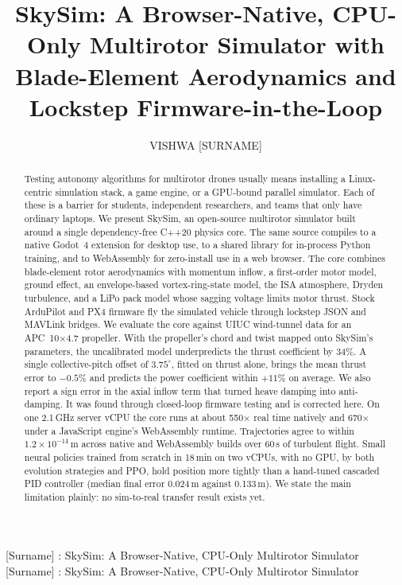 \documentclass{ieeeaccess}
\newcommand{\skysim}{SkySim\xspace}
\begin{document}

\title{SkySim: A Browser-Native, CPU-Only Multirotor Simulator with Blade-Element Aerodynamics and Lockstep Firmware-in-the-Loop}

\author{\uppercase{Vishwa [Surname]}}
\address[1]{Independent Researcher, Negombo, Sri Lanka (e-mail: [email])}

\markboth
{[Surname] \headeretal: SkySim: A Browser-Native, CPU-Only Multirotor Simulator}
{[Surname] \headeretal: SkySim: A Browser-Native, CPU-Only Multirotor Simulator}


\begin{abstract}
Testing autonomy algorithms for multirotor drones usually means installing a
Linux-centric simulation stack, a game engine, or a GPU-bound parallel
simulator. Each of these is a barrier for students, independent researchers,
and teams that only have ordinary laptops. We present \skysim, an open-source
multirotor simulator built around a single dependency-free C++20 physics core.
The same source compiles to a native Godot~4 extension for desktop use, to a
shared library for in-process Python training, and to WebAssembly for
zero-install use in a web browser. The core combines blade-element rotor
aerodynamics with momentum inflow, a first-order motor model, ground effect,
an envelope-based vortex-ring-state model, the ISA atmosphere, Dryden
turbulence, and a LiPo pack model whose sagging voltage limits motor thrust.
Stock ArduPilot and PX4 firmware fly the simulated vehicle through lockstep
JSON and MAVLink bridges. We evaluate the core against UIUC wind-tunnel data for
an APC~10$\times$4.7 propeller. With the propeller's chord and twist mapped onto
\skysim's parameters, the uncalibrated model underpredicts the thrust
coefficient by 34\%. A single collective-pitch offset of $3.75^\circ$, fitted on
thrust alone, brings the mean thrust error to $-0.5$\% and predicts the power
coefficient within $+11$\% on average. We also report a sign error in the axial
inflow term that turned heave damping into anti-damping. It was found through
closed-loop firmware testing and is corrected here. On one 2.1\,GHz server vCPU
the core runs at about 550$\times$ real time natively and 670$\times$ under a
JavaScript engine's WebAssembly runtime. Trajectories agree to within
$1.2\times10^{-14}$\,m across native and WebAssembly builds over 60\,s of
turbulent flight. Small neural policies trained from scratch in 18\,min on two
vCPUs, with no GPU, by both evolution strategies and PPO, hold position more
tightly than a hand-tuned cascaded PID controller (median final error
0.024\,m against 0.133\,m). We state the main limitation plainly: no sim-to-real transfer
result exists yet.
\end{abstract}
\end{document}
